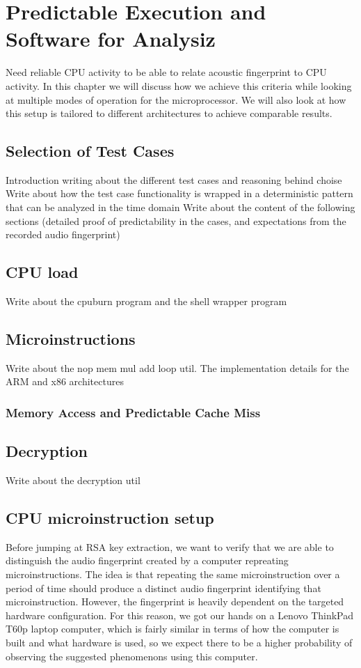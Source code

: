 \chapter{Predictable Execution and Software for Analysiz}\label{chp:analyzing} 
Need reliable CPU activity to be able to relate acoustic fingerprint to CPU activity.
In this chapter we will discuss how we achieve this criteria while looking at multiple modes of operation for the microprocessor.
We will also look at how this setup is tailored to different architectures to achieve comparable results.

\section{Selection of Test Cases}
Introduction writing about the different test cases and reasoning behind choise
Write about how the test case functionality is wrapped in a deterministic pattern that can be analyzed in the time domain
Write about the content of the following sections (detailed proof of predictability in the cases, and expectations from the recorded audio fingerprint)

\section{CPU load}
Write about the cpuburn program and the shell wrapper program

\section{Microinstructions}
Write about the nop mem mul add loop util.
The implementation details for the ARM and x86 architectures

\subsection{Memory Access and Predictable Cache Miss}


\section{Decryption}
Write about the decryption util


\section{CPU microinstruction setup}\label{sec:ch4_cpu_microinstruction_setup}
Before jumping at RSA key extraction, we want to verify that we are able to distinguish the audio fingerprint created by a computer repreating microinstructions. 
The idea is that repeating the same microinstruction over a period of time should produce a distinct audio fingerprint identifying that microinstruction. 
However, the fingerprint is heavily dependent on the targeted hardware configuration. 
For this reason, we got our hands on a Lenovo ThinkPad T60p laptop computer, which is fairly similar in terms of how the computer is built and what hardware is used, so we expect there to be a higher probability of observing the suggested phenomenons using this computer.

